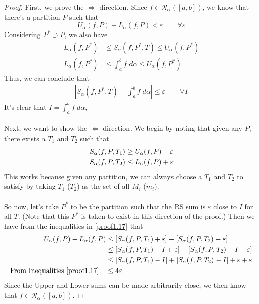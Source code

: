 \documentclass[12pt]{article}
\theoremstyle{plain}
\theoremstyle{definition}
\theoremstyle{remark}
\begin{document}
\begin{proof}
First, we prove the $\Rightarrow$ direction. Since $f\in\mathscr{R}_\alpha([a,b])$, we know that there's a partition $P$ such that
    \[ U_\alpha(f,P) - L_\alpha(f,P)<\varepsilon \qquad 
    \forall \varepsilon \]
Considering $P^*\supset P$, we also have
\begin{align*}
    L_\alpha(f,P^*)&\leq S_\alpha(f,P^*,T) \leq U_\alpha(f,P^*)\\
    L_\alpha(f,P^*)&\leq \int^b_a f\;d\alpha \leq U_\alpha(f,P^*)
\end{align*}
Thus, we can conclude that 
\begin{align*}
    \left\lvert S_\alpha(f,P^*,T) - \int^b_a f\;d\alpha 
    \right\rvert \leq \varepsilon \qquad \forall T
\end{align*}
It's clear that $I=\int^b_a f\;d\alpha$,
\\
\\
Next, we want to show the $\Leftarrow$ direction. We begin by noting that given any $P$, there exists a $T_1$ and $T_2$ such that
\begin{align}
    S_\alpha(f,P,T_1) &\geq U_\alpha(f,P) - \varepsilon\notag\\
    S_\alpha(f,P,T_2) &\leq L_\alpha(f,P) + \varepsilon
    \label{proof1.17}
\end{align}
This works because given any partition, we can always choose a $T_1$ and $T_2$ to satisfy by taking $T_1$ ($T_2$) as the set of all $M_i$ ($m_i$). 
\\
\\
So now, let's take $P^*$ to be the partition such that the RS sum is $\varepsilon$ close to $I$ for all $T$. (Note that this $P^*$ is taken to exist in this direction of the proof.) Then we have from the inequalities in \ref{proof1.17} that
\begin{align*}
    U_\alpha(f,P) - L_\alpha(f,P) &\leq 
        \left[ S_\alpha(f,P,T_1) + \varepsilon\right] -
        \left[ S_\alpha(f,P,T_2) - \varepsilon\right] \\
    &\leq \left[ S_\alpha(f,P,T_1) - I + \varepsilon\right] -
        \left[ S_\alpha(f,P,T_2) - I - \varepsilon\right] \\
    &\leq \left\lvert S_\alpha(f,P,T_1) - I \right\rvert+       
        \left\lvert S_\alpha(f,P,T_2) - I \right\rvert
        + \varepsilon + \varepsilon \\
    \text{From Inequalities \ref{proof1.17}} \quad
        &\leq 4\varepsilon
\end{align*}
Since the Upper and Lower sums can be made arbitrarily close, we then know that $f\in\mathscr{R}_\alpha([a,b])$.
\end{proof}
\end{document}
